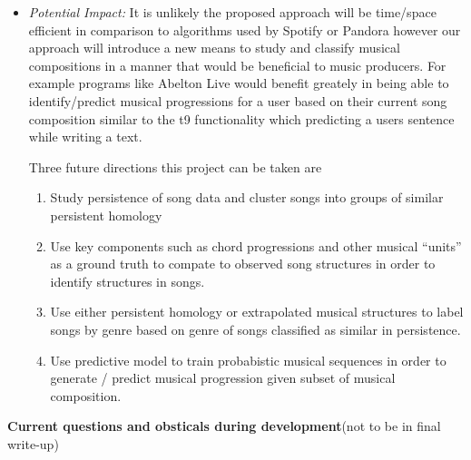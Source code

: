 \documentclass[11pt, a4paper]{article}
\begin{document}
\begin{enumerate}
\begin{itemize}
    
  \item \textit{Potential Impact:}
    It is unlikely the proposed approach will be time/space efficient in comparison to algorithms used by Spotify or Pandora however our approach will introduce a new means to study and classify musical compositions in a manner that would be beneficial to music producers. For example programs like Abelton Live would benefit greately in being able to identify/predict musical progressions for a user based on their current song composition similar to the t9 functionality which predicting a users sentence while writing a text.

    
      Three future directions this project can be taken are
      \begin{enumerate}
      \item Study persistence of song data and cluster songs into groups of similar persistent homology
      \item Use key components such as chord progressions and other musical ``units'' as a ground truth to compate to observed song structures in order to identify structures in songs.
      \item Use either persistent homology or extrapolated musical structures to label songs by genre based on genre of songs classified as similar in persistence.
      \item Use predictive model to train probabistic musical sequences in order to generate / predict musical progression given subset of musical composition.
      \end{enumerate}


  \end{itemize}
\end{enumerate}

  {\large {\bf Current questions and obsticals during development}}{\small (not to be in final write-up)}
  
\end{document}
